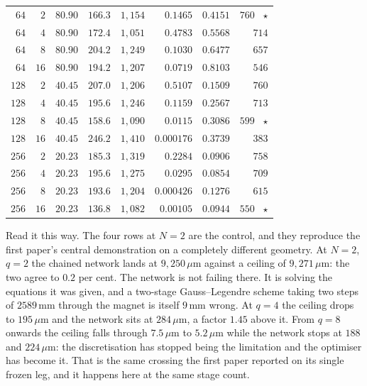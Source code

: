\documentclass[11pt,a4paper]{article}
\newcommand{\um}{\ensuremath{\,\mu\mathrm{m}}}
\newcommand{\mm}{\ensuremath{\,\mathrm{mm}}}
\begin{document}
\begin{table}[tbp]
\begin{tabular}{rrrrrrrr}
    \midrule
    $64$  & $2$  & $80.90$  & $166.3$   & $1{,}154$  & $0.1465$      & $0.4151$    & $760$ \ $\star$ \\
    $64$  & $4$  & $80.90$  & $172.4$   & $1{,}051$  & $0.4783$      & $0.5568$    & $714$ \\
    $64$  & $8$  & $80.90$  & $204.2$   & $1{,}249$  & $0.1030$      & $0.6477$    & $657$ \\
    $64$  & $16$ & $80.90$  & $194.2$   & $1{,}207$  & $0.0719$      & $0.8103$    & $546$ \\
    \midrule
    $128$ & $2$  & $40.45$  & $207.0$   & $1{,}206$  & $0.5107$      & $0.1509$    & $760$ \\
    $128$ & $4$  & $40.45$  & $195.6$   & $1{,}246$  & $0.1159$      & $0.2567$    & $713$ \\
    $128$ & $8$  & $40.45$  & $158.6$   & $1{,}090$  & $0.0115$      & $0.3086$    & $599$ \ $\star$ \\
    $128$ & $16$ & $40.45$  & $246.2$   & $1{,}410$  & $0.000176$    & $0.3739$    & $383$ \\
    \midrule
    $256$ & $2$  & $20.23$  & $185.3$   & $1{,}319$  & $0.2284$      & $0.0906$    & $758$ \\
    $256$ & $4$  & $20.23$  & $195.6$   & $1{,}275$  & $0.0295$      & $0.0854$    & $709$ \\
    $256$ & $8$  & $20.23$  & $193.6$   & $1{,}204$  & $0.000426$    & $0.1276$    & $615$ \\
    $256$ & $16$ & $20.23$  & $136.8$   & $1{,}082$  & $0.00105$     & $0.0944$    & $550$ \ $\star$ \\
    \bottomrule
  \end{tabular}
\end{table}

Read it this way. The four rows at $N = 2$ are the control, and they reproduce
the first paper's central demonstration on a completely different geometry. At
$N = 2$, $q = 2$ the chained network lands at $9{,}250\um$ against a ceiling of
$9{,}271\um$: the two agree to $0.2$ per cent. The network is not failing
there. It is solving the equations it was given, and a two-stage
Gauss--Legendre scheme taking two steps of $2589\mm$ through the magnet is
itself $9\mm$ wrong. At $q = 4$ the ceiling drops to $195\um$ and the network
sits at $284\um$, a factor $1.45$ above it. From $q = 8$ onwards the ceiling
falls through $7.5\um$ to $5.2\um$ while the network stops at $188$ and
$224\um$: the discretisation has stopped being the limitation and the optimiser
has become it. That is the same crossing the first paper reported on its single
frozen leg, and it happens here at the same stage count.
\end{document}
